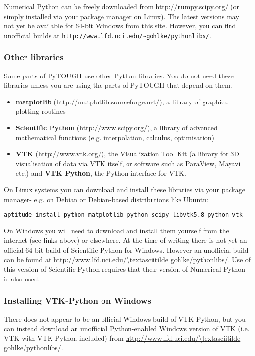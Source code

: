 Numerical Python can be freely downloaded from \url{http://numpy.scipy.org/} (or simply installed via your package manager on Linux). The latest versions may not yet be available for 64-bit Windows from this site.  However, you can find unofficial builds at \texttt{http://www.lfd.uci.edu/\textasciitilde gohlke/pythonlibs/}.

\subsubsection{Other libraries}

Some parts of PyTOUGH use other Python libraries.  You do not need these libraries unless you are using the parts of PyTOUGH that depend on them.

\begin{itemize}
\item \textbf{matplotlib} (\url{http://matplotlib.sourceforge.net/}), a library of graphical plotting routines
\item \textbf{Scientific Python} (\url{http://www.scipy.org/}), a library of advanced mathematical functions (e.g. interpolation, calculus, optimisation)
\item \textbf{VTK} (\url{http://www.vtk.org/}), the Visualization Tool Kit (a library for 3D visualisation of data via VTK itself, or software such as ParaView, Mayavi etc.) and \textbf{VTK Python}, the Python interface for VTK.
\end{itemize}

On Linux systems you can download and install these libraries via your package manager- e.g. on Debian or Debian-based distributions like Ubuntu:

\texttt{aptitude install python-matplotlib python-scipy libvtk5.8 python-vtk}

On Windows you will need to download and install them yourself from the internet (see links above) or elsewhere.  At the time of writing there is not yet an official 64-bit build of Scientific Python for Windows.  However an unofficial build can be found at \url{http://www.lfd.uci.edu/\textasciitilde gohlke/pythonlibs/}.  Use of this version of Scientific Python requires that their version of Numerical Python is also used.

\subsubsection{Installing VTK-Python on Windows}

There does not appear to be an official Windows build of VTK Python, but you can instead download an unofficial Python-enabled Windows version of VTK (i.e. VTK with VTK Python included) from \url{http://www.lfd.uci.edu/\textasciitilde gohlke/pythonlibs/}.


